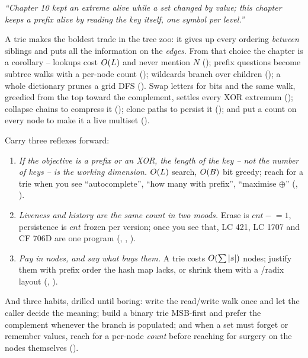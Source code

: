 \begin{lastword}
\emph{``Chapter 10 kept an extreme alive while a set changed by value; this chapter keeps a \emph{prefix}
alive by reading the key itself, one symbol per level.''}

\medskip
A trie makes the boldest trade in the tree zoo: it gives up every ordering \emph{between} siblings and puts
all the information on the \emph{edges}. From that choice the chapter is a corollary -- lookups cost
$O(L)$ and never mention $N$ (); prefix questions become subtree walks with a
per-node count (); wildcards branch over children (); a whole
dictionary prunes a grid DFS (). Swap letters for bits and the same walk, greedied
from the top toward the complement, settles every XOR extremum (); collapse chains to
compress it (); clone paths to persist it (); and put a count on
every node to make it a live multiset ().

\medskip
Carry three reflexes forward:
\begin{enumerate}[nosep, leftmargin=1.6em]
  \item \emph{If the objective is a prefix or an XOR, the length of the key -- not the number of keys -- is
        the working dimension.} $O(L)$ search, $O(B)$ bit greedy; reach for a trie when you see
        ``autocomplete'', ``how many with prefix'', ``maximise $\oplus$'' (,
        ).
  \item \emph{Liveness and history are the same count in two moods.} Erase is $\mathit{cnt}\mathrel{-}=1$,
        persistence is $\mathit{cnt}$ frozen per version; once you see that, LC 421, LC 1707 and CF 706D are
        one program (, , ).
  \item \emph{Pay in nodes, and say what buys them.} A trie costs $O(\sum|s|)$ nodes; justify them with
        prefix order the hash map lacks, or shrink them with a /radix layout
        (, ).
\end{enumerate}

\medskip
And three habits, drilled until boring: write the read/write walk once and let the caller decide the meaning;
build a binary trie MSB-first and prefer the complement whenever the branch is populated; and when a set
must forget or remember values, reach for a per-node \emph{count} before reaching for surgery on the nodes
themselves ().


\end{lastword}
